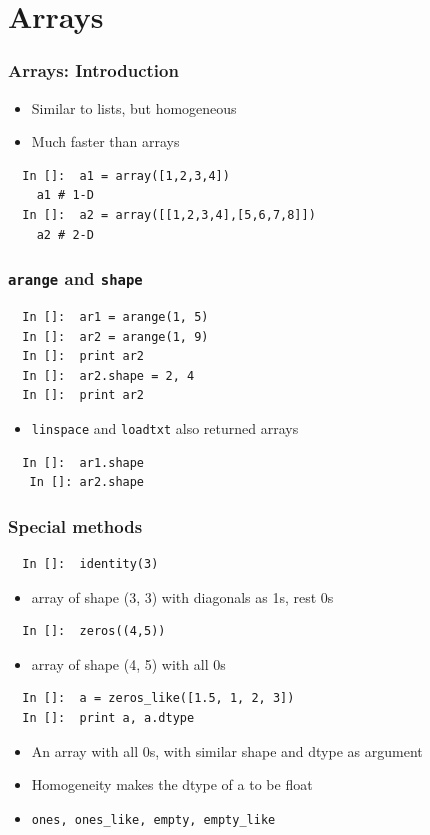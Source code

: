 \section{Arrays}

\begin{frame}[fragile]
  \frametitle{Arrays: Introduction}
  \begin{itemize}
  \item Similar to lists, but homogeneous
  \item Much faster than arrays
  \end{itemize}
  \begin{lstlisting}
  In []:  a1 = array([1,2,3,4])
    a1 # 1-D
  In []:  a2 = array([[1,2,3,4],[5,6,7,8]])
    a2 # 2-D
  \end{lstlisting}
\end{frame}

\begin{frame}[fragile]
  \frametitle{\texttt{arange} and \texttt{shape}}
  \begin{lstlisting}
  In []:  ar1 = arange(1, 5)
  In []:  ar2 = arange(1, 9) 
  In []:  print ar2
  In []:  ar2.shape = 2, 4
  In []:  print ar2
  \end{lstlisting}
  \begin{itemize}
  \item \texttt{linspace} and \texttt{loadtxt} also returned arrays
  \end{itemize}
  \begin{lstlisting}
  In []:  ar1.shape
   In []: ar2.shape
  \end{lstlisting}
\end{frame}

\begin{frame}[fragile]
  \frametitle{Special methods}
  \begin{lstlisting}
  In []:  identity(3)
  \end{lstlisting}
  \begin{itemize}
  \item array of shape (3, 3) with diagonals as 1s, rest 0s
  \end{itemize}
  \begin{lstlisting}
  In []:  zeros((4,5))
  \end{lstlisting}
  \begin{itemize}
  \item array of shape (4, 5) with all 0s
  \end{itemize}
  \begin{lstlisting}
  In []:  a = zeros_like([1.5, 1, 2, 3])
  In []:  print a, a.dtype
  \end{lstlisting}
  \begin{itemize}
  \item An array with all 0s, with similar shape and dtype as argument
  \item Homogeneity makes the dtype of a to be float
  \item \texttt{ones, ones\_like, empty, empty\_like}
  \end{itemize}
\end{frame}

